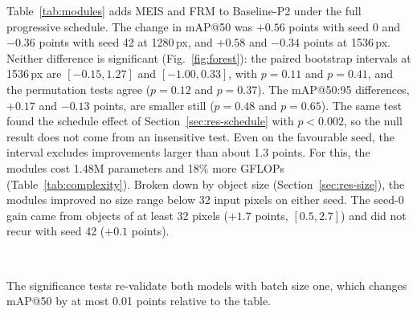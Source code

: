 \documentclass[preprint,12pt]{elsarticle}
\begin{document}
Table~\ref{tab:modules} adds MEIS and FRM to Baseline-P2 under the full
progressive schedule. The change in mAP@50 was $+0.56$ points with seed 0 and
$-0.36$ points with seed 42 at 1280\,px, and $+0.58$ and $-0.34$ points at
1536\,px. Neither difference is significant (Fig.~\ref{fig:forest}): the paired
bootstrap intervals at 1536\,px are $[-0.15, 1.27]$ and $[-1.00, 0.33]$, with
$p=0.11$ and $p=0.41$, and the permutation tests agree ($p=0.12$ and $p=0.37$).
The mAP@50:95 differences, $+0.17$ and $-0.13$ points, are smaller still ($p=0.48$
and $p=0.65$). The same test found the schedule effect of
Section~\ref{sec:res-schedule} with $p<0.002$, so the null result does not come
from an insensitive test. Even on the favourable seed, the interval excludes
improvements larger than about 1.3 points. For this, the modules cost 1.48M
parameters and 18\% more GFLOPs (Table~\ref{tab:complexity}). Broken down by
object size (Section~\ref{sec:res-size}), the modules improved no size range
below 32 input pixels on either seed. The seed-0 gain came from objects of at
least 32 pixels ($+1.7$ points, $[0.5, 2.7]$) and did not recur with seed 42
($+0.1$ points).

\begin{table}[t]
\centering
\caption{Adding MEIS and FRM to Baseline-P2 under the full progressive schedule.
The paired tests are computed at 1536\,px over the 548 validation images.}
\label{tab:modules}
\small
{}
\\[2pt]
\begin{minipage}{\linewidth}\footnotesize
The significance tests re-validate both models with batch size one, which changes
mAP@50 by at most 0.01 points relative to the table.
\end{minipage}
\end{table}
\end{document}
